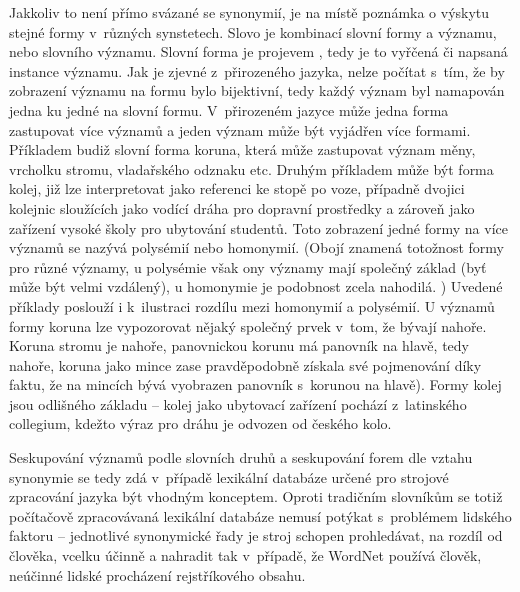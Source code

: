 \documentclass[a4paper, 11pt, oneside, showtrims]{book}
\newcommand\ex{\textsf}
\begin{document}
					Jakkoliv to není přímo svázané se synonymií, je na místě poznámka o výskytu stejné formy v~různých synstetech. Slovo je kombinací slovní formy a významu, nebo slovního významu. Slovní forma je projevem , tedy je to vyřčená či napsaná instance významu. Jak je zjevné z~přirozeného jazyka, nelze počítat s~tím, že by zobrazení významu na formu bylo bijektivní, tedy každý význam byl namapován jedna ku jedné na slovní formu. V~přirozeném jazyce může jedna forma zastupovat více významů a jeden význam může být vyjádřen více formami. Příkladem budiž slovní forma \ex{koruna}, která může zastupovat význam měny, vrcholku stromu, vladařského odznaku etc. Druhým příkladem může být forma \ex{kolej}, již lze interpretovat jako referenci ke stopě po voze, případně dvojici kolejnic sloužících jako vodící dráha pro dopravní prostředky a zároveň jako zařízení vysoké školy pro ubytování studentů. \parencite{Havranek1989} Toto zobrazení jedné formy na více významů se nazývá polysémií nebo homonymií. (Obojí znamená totožnost formy pro různé významy, u polysémie však ony významy mají společný základ (byť může být velmi vzdálený), u homonymie je podobnost zcela nahodilá. \parencite{klepousniotou2002processing}) Uvedené příklady poslouží i k~ilustraci rozdílu mezi homonymií a polysémií. U významů formy \ex{koruna} lze vypozorovat nějaký společný prvek v~tom, že bývají nahoře. \ex{Koruna} stromu je nahoře, panovnickou \ex{korunu} má panovník na hlavě, tedy nahoře, \ex{koruna} jako mince zase pravděpodobně získala své pojmenování díky faktu, že na mincích bývá vyobrazen panovník s~\ex{korunou} na hlavě). Formy \ex{kolej} jsou odlišného základu -- \ex{kolej} jako ubytovací zařízení pochází z~latinského \ex{collegium}, kdežto výraz pro dráhu je odvozen od českého \ex{kolo}. \parencite{Rejzek2012}

					Seskupování významů podle slovních druhů a seskupování forem dle vztahu synonymie se tedy zdá v~případě lexikální databáze určené pro strojové zpracování jazyka být vhodným konceptem. Oproti tradičním slovníkům se totiž počítačově zpracovávaná lexikální databáze nemusí potýkat s~problémem lidského faktoru -- jednotlivé synonymické řady je stroj schopen prohledávat, na rozdíl od člověka, vcelku účinně a nahradit tak v~případě, že WordNet používá člověk, neúčinné lidské procházení rejstříkového obsahu.

					
\end{document}
